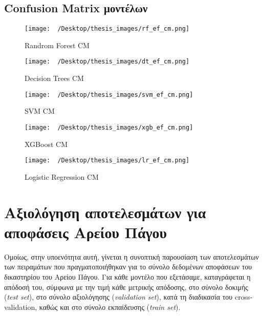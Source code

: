 \documentclass[diploma]{softlab-thesis}
\begin{document}
\begin{enumerate}
\begin{enumerate}
\subsection{Confusion Matrix μοντέλων}

\begin{figure}[H]
    \centering
    \texttt{[image: ~/Desktop/thesis\_images/rf\_ef\_cm.png]} %
    \caption{Randrom Forest CM}
    \label{fig:your_image_label}
\end{figure}

\begin{figure}[H]
    \centering
    \texttt{[image: ~/Desktop/thesis\_images/dt\_ef\_cm.png]} %
    \caption{Decision Trees CM}
    \label{fig:your_image_label}
\end{figure}


\begin{figure}[H]
    \centering
    \texttt{[image: ~/Desktop/thesis\_images/svm\_ef\_cm.png]} %
    \caption{SVM CM}
    \label{fig:your_image_label}
\end{figure}

\begin{figure}[H]
    \centering
    \texttt{[image: ~/Desktop/thesis\_images/xgb\_ef\_cm.png]} %
    \caption{XGBoost CM}
    \label{fig:your_image_label}
\end{figure}

\begin{figure}[H]
    \centering
    \texttt{[image: ~/Desktop/thesis\_images/lr\_ef\_cm.png]} %
    \caption{Logistic Regression CM}
    \label{fig:your_image_label}
\end{figure}


\section{Αξιολόγηση αποτελεσμάτων για αποφάσεις Αρείου Πάγου}

Ομοίως, στην υποενότητα αυτή, γίνεται η συνοπτική παρουσίαση των αποτελεσμάτων των πειραμάτων που πραγματοποιήθηκαν για το σύνολο δεδομένων αποφάσεων του δικαστηρίου του Αρείου Πάγου. Για κάθε μοντέλο που εξετάσαμε, καταγράφεται η απόδοσή του, σύμφωνα με την τιμή κάθε μετρικής απόδοσης, στο σύνολο δοκιμής (\textit{test set}), στο σύνολο αξιολόγησης (\textit{validation set}), κατά τη διαδικασία του cross-validation, καθώς και στο σύνολο εκπαίδευσης (\textit{train set}).


\end{enumerate}
\end{enumerate}
\end{document}
